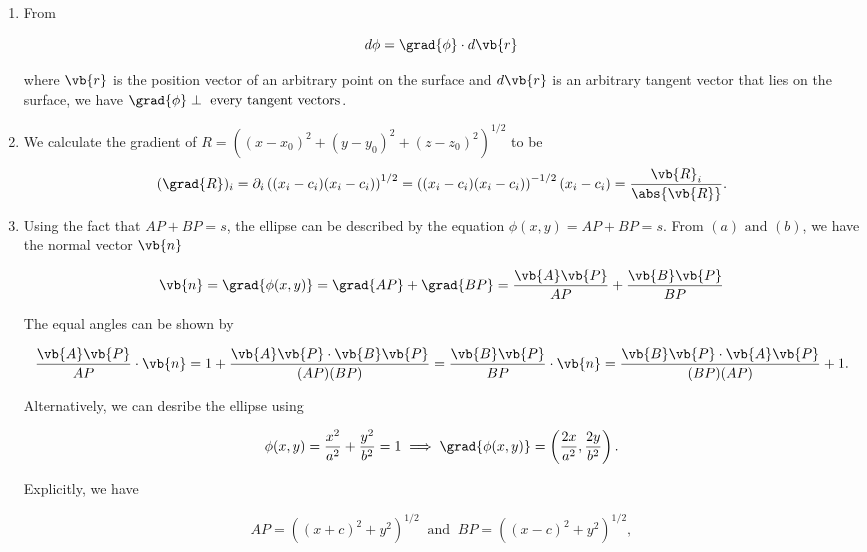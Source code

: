 \documentclass[english,a4paper,12pt]{report}
\begin{document}
{\begin{enumerate}
	\item From 
	
	\begin{equation}
		d \phi = \grad{\phi } \cdot d\vb{r}
	\end{equation}
	
	where \(\vb{r} \) is the position vector of an arbitrary point on the surface and \(d\vb{r} \) is an arbitrary tangent vector that lies on the surface, we have \(\grad{\phi } \perp \text{ every tangent vectors} \). 
	\item We calculate the gradient of \(R= ((x-x_0 )^2+(y-y_0 )^2+(z-z_0 )^2)^{1 /2} \) to be
	\begin{equation}
		(\grad{R} )_{i} = \partial _{i} \left( (x_{i} - c_{i}  ) (x_{i } - c_{i}  )\right)^{1 /2} = \left( (x_{i}-c_{i}  )(x_{i} - c_{i}  ) \right)^{-1/2} (x_{i} - c_{i}  ) = \frac{\vb{R}_{i} }{\abs{\vb{R} } }.      
	\end{equation}
	\item Using the fact that \(AP + BP = s\), the ellipse can be described by the equation \(\phi (x,y) = AP + BP = s\). From \((a) \text { and } (b)\), we have the normal vector \(\vb{n} \)

	\begin{equation}
		\vb{n} = \grad{\phi (x,y)} = \grad{AP} + \grad{BP} = \frac{\vb{A} \vb{P} }{AP} + \frac{\vb{B} \vb{P} }{BP}     
	\end{equation}

	The equal angles can be shown by 

	\begin{equation}
		\frac{\vb{A} \vb{P} }{AP} \cdot \vb{n} = 1 + \frac{\vb{A} \vb{P} \cdot \vb{B} \vb{P} }{(AP)(BP)} = \frac{\vb{B} \vb{P} }{BP} \cdot \vb{n} = \frac{\vb{B} \vb{P} \cdot \vb{A} \vb{P} }{(BP)(AP)} + 1.    
	\end{equation}
	
	Alternatively, we can desribe the ellipse using 

	\begin{equation}
		\phi (x,y) = \frac{x^2}{a^2} + \frac{y^2}{b^2} = 1 \implies \grad{\phi (x,y)} = \left( \frac{2x}{a^2},\frac{2y}{b^2}   \right).
	\end{equation}

	Explicitly, we have

	\begin{equation}
		AP = \left( (x+c)^2+y^2 \right)^{1 /2} ~\text { and }~ BP = \left( (x-c)^2+y^2 \right) ^{1 /2}, 
	\end{equation}


\end{enumerate}}
\end{document}
